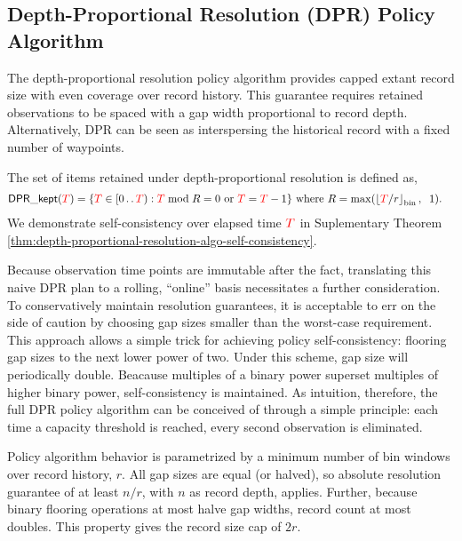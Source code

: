 \subsection{Depth-Proportional Resolution (DPR) Policy Algorithm}
\label{sec:depth-proportional-resolution-algo}

The depth-proportional resolution policy algorithm provides capped extant record size with even coverage over record history.
This guarantee requires retained observations to be spaced with a gap width proportional to record depth.
Alternatively, DPR can be seen as interspersing the historical record with a fixed number of waypoints.

The set of items retained under depth-proportional resolution is defined as,
\begin{align}
\mathsf{DPR\_kept}(\colorT)
&= \{
\colorTbar \in [0\twodots\colorT)
: \colorTbar \bmod R = 0 \text{ or } \colorTbar = \colorT - 1
\}
\text{ where }
R = \max(\left \lfloor \colorT / r \right \rfloor_{\mathrm{bin}}, \;\; 1).
\label{eqn:dpr_kept}
\end{align}
We demonstrate self-consistency over elapsed time $\colorT$ in Suplementary Theorem \ref{thm:depth-proportional-resolution-algo-self-consistency}.

Because observation time points are immutable after the fact, translating this naive DPR plan to a rolling, ``online'' basis necessitates a further consideration.
To conservatively maintain resolution guarantees, it is acceptable to err on the side of caution by choosing gap sizes smaller than the worst-case requirement.
This approach allows a simple trick for achieving policy self-consistency: flooring gap sizes to the next lower power of two.
Under this scheme, gap size will periodically double.
Beacause multiples of a binary power superset multiples of higher binary power, self-consistency is maintained.
As intuition, therefore, the full DPR policy algorithm can be conceived of through a simple principle: %
each time a capacity threshold is reached, every second observation is eliminated.

Policy algorithm behavior is parametrized by a minimum number of bin windows over record history, $r$.
All gap sizes are equal (or halved), so absolute resolution guarantee of at least $n/r$, with $n$ as record depth, applies.
Further, because binary flooring operations at most halve gap widths, record count at most doubles.
This property gives the record size cap of $2r$.

